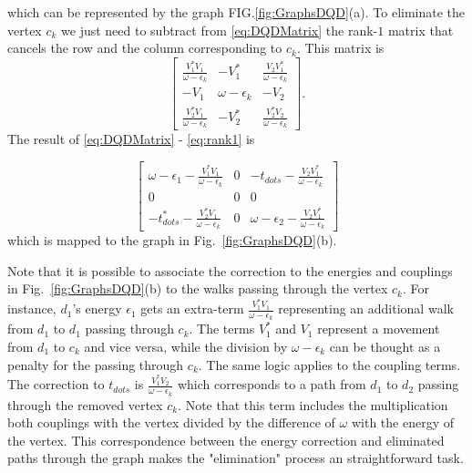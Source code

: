 \documentclass[showpacs,aps,prb,reprint,superscriptaddress]{revtex4-1}
\begin{document}
\noindent which can be represented by the graph FIG.\ref{fig:GraphsDQD}(a). To eliminate the vertex $c_k$ we just need to subtract from \eqref{eq:DQDMatrix} the rank-$1$ matrix that cancels the row and the column corresponding to $c_k$. This matrix is 
\begin{equation}
        \left[\begin{array}{ccc}
    \frac{V_{1}^{*}V_{1}}{\omega-\epsilon_{k}} & -V_{1}^{*} & \frac{V_{2}V_{1}^{*}}{\omega-\epsilon_{k}}\\
    -V_{1} & \omega-\epsilon_{k} & -V_{2}\\
    \frac{V_{2}^{*}V_{1}}{\omega-\epsilon_{k}} & -V_{2}^{*} & \frac{V_{2}^{*}V_{2}}{\omega-\epsilon_{k}}
    \end{array}\right]. \label{eq:rank1}
\end{equation}
The result of \eqref{eq:DQDMatrix} -  \eqref{eq:rank1} is 

\begin{equation}
        \left[\begin{array}{ccc}
    \omega-\epsilon_{1}-\frac{V_{1}^{*}V_{1}}{\omega-\epsilon_{k}} & 0 & -t_{dots}-\frac{V_{2}V_{1}^{*}}{\omega-\epsilon_{k}}\\
    0 & 0 & 0\\
    -t_{dots}^{*}-\frac{V_{2}^{*}V_{1}}{\omega-\epsilon_{k}} & 0 & \omega-\epsilon_{2}-\frac{V_{2}V_{1}^{*}}{\omega-\epsilon_{k}}
    \end{array}\right]
\end{equation}
\noindent which is mapped to the graph in Fig.\ \ref{fig:GraphsDQD}(b).

Note that it is possible to associate the correction to the energies and couplings in Fig.\ \ref{fig:GraphsDQD}(b) to the walks passing through the vertex $c_k$.  For instance, $d_1$'s energy $\epsilon_1$ gets an extra-term $\frac{V_{1}^{*}V_{1}}{\omega-\epsilon_{k}}$ representing an additional walk  from $d_1$ to $d_1$ passing through  $c_k$. The terms $V_1^*$ and $V_1$ represent a movement from $d_1$ to $c_k$ and vice versa, while the division by $\omega-\epsilon_{k}$ can be thought as a penalty for the passing through $c_k$.  The same logic applies to the  coupling terms. The correction to $t_{dots}$ is $\frac{V_{1}^{*}V_{2}}{\omega-\epsilon_{k}}$ which corresponds to a path from $d_1$ to $d_2$ passing through the removed vertex $c_k$. Note that this term includes the multiplication both couplings with the vertex divided by the difference of $\omega$ with the energy of the vertex. This correspondence between the energy correction and eliminated paths through the graph makes the "elimination" process an straightforward task. 
\end{document}

